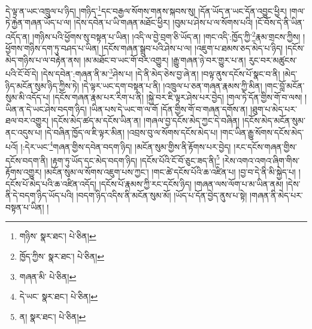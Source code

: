 དེ་ལྟ་ན་ཡང་འཁྲུལ་པ་ཉིད། །གཉིད་\footnote{གཉིས་  སྣར་ཐང་།  པེ་ཅིན། }དང་བརྒྱལ་སོགས་གནས་སྐབས་སུ། །དོན་ཡོད་ན་ཡང་དོན་འབྱུང་ཕྱིར། །གལ་ཏེ་རྐྱེན་གཞན་ཡོད་པ་ལ། །དེས་དབེན་པ་ཡི་གཞན་མཐོང་ཕྱིར། །བུམ་པ་ཤེས་པ་ལ་སོགས་པའི། །ངོ་བོས་དེ་ནི་ཡིན་འདོད་ན། །གཉིས་པའི་ཕྱོགས་སུ་བསྟན་པ་ཡིན། །འདི་ལ་བྱེ་བྲག་ཅི་ཡོད་ན། །གང་འདི་:ཁྱོད་ཀྱི་\footnote{ཁྱོད་ཀྱིས་  སྣར་ཐང་།  པེ་ཅིན། }རྣམ་གྲངས་ཀྱིས། །ཕྱོགས་གཉིས་དག་ཏུ་བཤད་པ་ཡིན། །དངོས་གཞན་སྒྲུབ་པའི་ཤེས་པ་ལ། །འཇུག་པ་ཐམས་ཅད་མེད་པ་ཉིད། །དངོས་མེད་གཉིས་པ་ལ་བརྟེན་ནས། །མ་མཐོང་བ་ཡང་གོ་བར་འགྱུར། །རྒྱུ་གཞན་ཉེ་བར་གྱུར་པ་ན། རུང་བར་མཚུངས་པའི་ངོ་བོ་དེ། །དེས་དབེན་:གཞན་ནི་མ་\footnote{གཞན་མི་  པེ་ཅིན། }ཤེས་པ། །དེ་ནི་མེད་ཅེས་བྱ་ཞེ་ན། །བལྟ་ནུས་དངོས་པོ་སྣང་བ་ནི། །མེད་ཉིད་མངོན་སུམ་ཉིད་ཀྱིས་ཏེ། །དེ་ལྟར་ཡང་དག་བསྟན་པ་ནི། །འཁྲུལ་པ་ཅན་གཞན་རྣམས་ཀྱི་མིན། །གང་བློ་མངོན་སུམ་མི་འདོད་པ། །དངོས་གཞན་རྣམ་པར་རིག་པ་ནི། །སྐྱེ་བར་ཇི་ལྟར་ཤེས་པར་བྱེད། །གལ་ཏེ་དོན་གྱིས་གོ་བ་ལས། །ཡིན་ན་དེ་ཡང་ཤེས་བདག་ཉིད། །ཡིན་པས་དེ་ཡང་ག་ལ་གོ །དོན་གྱིས་གོ་བ་གཞན་དགོས་ན། །ཐུག་པ་མེད་པར་ཐལ་བར་འགྱུར། །དངོས་མེད་ཚད་མ་དངོས་ཡིན་ན། །གཞལ་བྱ་དངོས་མེད་ཀྱང་དེ་བཞིན། །དངོས་མེད་མངོན་སུམ་ནང་འདུས་པ། །དེ་བཞིན་ཁྱོད་ལ་ཇི་ལྟར་མིན། །འབྲས་བུ་ལ་སོགས་དངོས་མེད་པ། །གང་ཡིན་རྒྱུ་སོགས་དངོས་མེད་པའོ། །:དེར་ཡང་\footnote{དེ་ཡང་  སྣར་ཐང་།  པེ་ཅིན། }གཞན་གྱིས་དབེན་བདག་ཉིད། །མངོན་སུམ་གྱིས་ནི་རྟོགས་པར་བྱེད། །རང་དངོས་གཞན་གྱིས་དངོས་བདག་ནི། །རྟག་ཏུ་ཡོད་དང་མེད་བདག་ཉིད། །དངོས་པོའི་ངོ་བོ་ཅུང་ཟད་ནི།\footnote{ན།  སྣར་ཐང་།  པེ་ཅིན། } །རེས་འགའ་འགའ་ཞིག་གིས་རྟོགས་འགྱུར། །མངོན་སུམ་ལ་སོགས་འཇུག་པས་ཀྱང་། །གང་ཚེ་དངོས་པོའི་ཆ་འཛིན་པ། །བྱ་བ་དེ་ནི་མི་སྐྱེད་པ། །དངོས་པོ་མེད་པའི་ཆ་འཛིན་འདོད། །དངོས་པོ་རྣམས་ཀྱི་རང་དངོས་ཉིད། །གཞན་ལས་ལོག་པ་མ་ཡིན་ནམ། །དེས་ནི་དེ་བདག་ཉིད་ཡོད་པའི། །བདག་ཉིད་འདིས་ནི་མངོན་སུམ་མོ། །ཡོད་པ་དོན་བྱེད་ནུས་པ་སྟེ། །གཞན་ནི་མེད་པར་བསྟན་པ་ཡིན། །
